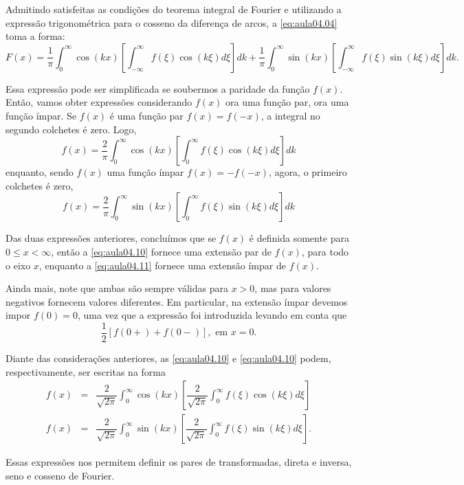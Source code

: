 Admitindo satisfeitas as condições do teorema integral de Fourier e utilizando a expressão trigonométrica para o cosseno da diferença de arcos, a \autoref{eq:aula04.04} toma a forma:
{\small
$$F(x) =
\dfrac{1}{\pi}
\int_{0}^{\infty}
\cos(kx) \left[
\int_{-\infty}^{\infty}
f(\xi) \cos(k\xi) d\xi 
\right] dk
+
\dfrac{1}{\pi}
\int_{0}^{\infty}
\sin(kx) \left[
\int_{-\infty}^{\infty}
f(\xi) \sin(k\xi) d\xi 
\right] dk.
$$
}

Essa expressão pode ser simplificada se soubermos a paridade da função $f(x)$. Então, vamos obter expressões considerando $f(x)$ ora uma função par, ora uma função ímpar. Se $f(x)$ é uma função par $f(x) = f(-x)$, a integral no segundo colchetes é zero. Logo,
\begin{equation}\label{eq:aula04.10}
f(x) =
\dfrac{2}{\pi}
\int_{0}^{\infty}
\cos(kx) \left[
\int_{0}^{\infty}
f(\xi) \cos(k\xi) d\xi 
\right]
dk
\end{equation}
enquanto, sendo $f(x)$ uma função ímpar $f(x) = -f(-x)$, agora, o primeiro colchetes é zero,
\begin{equation}\label{eq:aula04.11}
f(x) =
\dfrac{2}{\pi}
\int_{0}^{\infty}
\sin(kx) \left[
\int_{0}^{\infty}
f(\xi) \sin(k\xi) d\xi 
\right] dk
\end{equation}

Das duas expressões anteriores, concluímos que se $f(x)$ é definida somente para $0 \le x < \infty$, então a \autoref{eq:aula04.10} fornece uma extensão par de $f(x)$, para todo o eixo $x$, enquanto a \autoref{eq:aula04.11} fornece uma extensão ímpar de $f(x)$.

Ainda mais, note que ambas são sempre válidas para $x > 0$, mas para valores negativos fornecem valores diferentes. Em particular, na extensão ímpar devemos impor $f(0) = 0$, uma vez que a expressão foi introduzida levando em conta que
$$\dfrac{1}{2}[f(0+) + f(0-)], \mbox{ em } x = 0.$$

Diante das considerações anteriores, as \autoref{eq:aula04.10} e \autoref{eq:aula04.10} podem, respectivamente, ser escritas na forma
\begin{eqnarray*}
f(x) &=&
\dfrac{2}{\sqrt{2\pi}}
\int_{0}^{\infty}
\cos(kx)
\left[
\dfrac{2}{\sqrt{2\pi}}
\int_{0}^{\infty}
f(\xi) \cos(k\xi) d\xi 
\right] \\
f(x) &=&
\dfrac{2}{\sqrt{2\pi}}
\int_{0}^{\infty}
\sin(kx)
\left[
\dfrac{2}{\sqrt{2\pi}}
\int_{0}^{\infty}
f(\xi) \sin(k\xi) d\xi 
\right].
\end{eqnarray*}

Essas expressões nos permitem definir os pares de transformadas, direta e inversa, seno e cosseno de Fourier.


